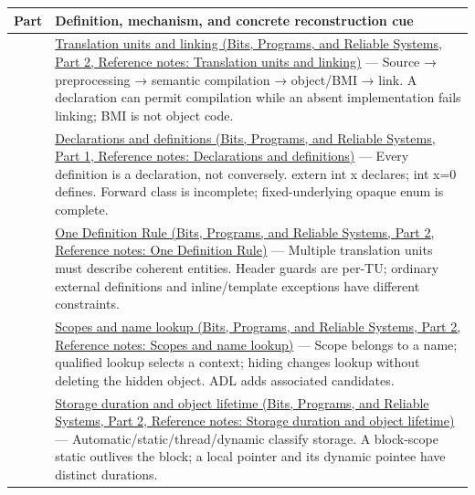 {\def\LTcaptype{none} %
\begin{longtable}[]{@{}
  >{\raggedright\arraybackslash}p{}
  >{\raggedright\arraybackslash}p{}@{}}
\toprule\noalign{}
\begin{minipage}[b]{\linewidth}\raggedright
Part
\end{minipage} & \begin{minipage}[b]{\linewidth}\raggedright
Definition, mechanism, and concrete reconstruction cue
\end{minipage} \\
\midrule\noalign{}
\endhead
\bottomrule\noalign{}
\endlastfoot
101 & \href{../01-Bits-Programs-and-Reliable-Systems-P02/main.pdf\#appendix-806686359e1b}{Translation units and linking (Bits, Programs, and Reliable Systems, Part 2, Reference notes: Translation units and linking)} --- Source → preprocessing → semantic compilation → object/BMI → link. A declaration can permit compilation while an absent implementation fails linking; BMI is not object code. \\
102 & \href{../01-Bits-Programs-and-Reliable-Systems-P01/main.pdf\#appendix-2e4d494c2d94}{Declarations and definitions (Bits, Programs, and Reliable Systems, Part 1, Reference notes: Declarations and definitions)} --- Every definition is a declaration, not conversely. extern int x declares; int x=0 defines. Forward class is incomplete; fixed-underlying opaque enum is complete. \\
103 & \href{../01-Bits-Programs-and-Reliable-Systems-P02/main.pdf\#appendix-49d27bc9d9a5}{One Definition Rule (Bits, Programs, and Reliable Systems, Part 2, Reference notes: One Definition Rule)} --- Multiple translation units must describe coherent entities. Header guards are per-TU; ordinary external definitions and inline/template exceptions have different constraints. \\
104 & \href{../01-Bits-Programs-and-Reliable-Systems-P02/main.pdf\#appendix-b12b31759da1}{Scopes and name lookup (Bits, Programs, and Reliable Systems, Part 2, Reference notes: Scopes and name lookup)} --- Scope belongs to a name; qualified lookup selects a context; hiding changes lookup without deleting the hidden object. ADL adds associated candidates. \\
105 & \href{../01-Bits-Programs-and-Reliable-Systems-P02/main.pdf\#appendix-0b104bcba06b}{Storage duration and object lifetime (Bits, Programs, and Reliable Systems, Part 2, Reference notes: Storage duration and object lifetime)} --- Automatic/static/thread/dynamic classify storage. A block-scope static outlives the block; a local pointer and its dynamic pointee have distinct durations. \\

\end{longtable}}
